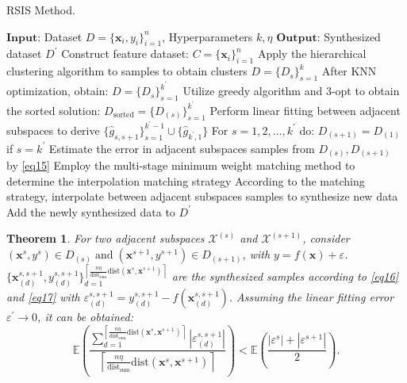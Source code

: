 \documentclass[final,3p,times]{elsarticle}
\newtheorem{theorem}{Theorem}
\begin{document}
\begin{algorithm}[h!]
  \caption{RSIS Method.}\label{alg:alg3}
  \begin{algorithmic}
  \STATE 
  \STATE $\mathbf{Input}$: Dataset $D=\{\boldsymbol{x}_i,y_i \}_{i=1}^n$,
  Hyperparameters $k,\eta$
  \STATE $\mathbf{Output}$: Synthesized dataset $D^\prime$
  \vspace{5pt} %
  \STATE Construct feature dataset: $C=\{\boldsymbol{x}_i\}_{i=1}^n$
  \STATE Apply the hierarchical clustering algorithm to samples to obtain clusters $D=\{D_s\}_{s=1}^{k}$
  \STATE After KNN optimization, obtain: $D=\{D_s\}_{s=1}^{k^\prime}$
  \STATE Utilize greedy algorithm and 3-opt to obtain the sorted solution: $D_{\text{sorted}}=\{D_{(s)}\}_{s=1}^{k^\prime}$
  \STATE Perform linear fitting between adjacent subspaces to derive $\{\hat{g}_{s,s+1}\}_{s=1}^{k^\prime-1}\cup\{\hat{g}_{k^\prime,1}\}$
  \STATE For $s=1,2,\ldots,k^\prime$ do:
  {\color{myred}\STATE \hspace{0.5cm}$D_{(s+1)}=D_{(1)}$ if $s=k^\prime$}
  \STATE \hspace{0.5cm}Estimate the error in adjacent subspaces samples from $D_{(s)},D_{(s+1)}$ by \eqref{eq15}
  \STATE \hspace{0.5cm}Employ the multi-stage minimum weight matching method to determine the interpolation matching strategy
  \STATE \hspace{0.5cm}According to the matching strategy, interpolate between adjacent subspaces samples to synthesize 
new data
  \STATE \hspace{0.5cm}Add the newly synthesized data to $D^\prime$
  \end{algorithmic}
  \label{Alg3}
\end{algorithm}

\begin{theorem}
\label{the4}
For two adjacent subspaces $\mathcal{X}^{(s)}$ and 
$\mathcal{X}^{(s+1)}$, consider $(\boldsymbol{x}^s,{y}^s)\in D_{(s)}
\;\text{and}\; (\boldsymbol{x}^{s+1},{y}^{s+1})\in D_{(s+1)}$, 
with ${y}=f(\boldsymbol{x})+\varepsilon$. $\{\boldsymbol{x}_{(d)}
^{s,s+1},y_{(d)}^{s,s+1} \}_{d=1}^{\left\lceil \frac{n\eta }
{\text{dist}_{\text{sum}}}\text{dist}(\boldsymbol{x}^s,\boldsymbol
{x}^{s+1})\right\rceil}$ are the synthesized samples according to 
\eqref{eq16} and \eqref{eq17} with $\varepsilon^{s,s+1}_{(d)}=
y_{(d)}^{s,s+1}-f(\boldsymbol{x}_{(d)}^{s,s+1})$. Assuming the 
linear fitting error $\varepsilon^\prime\rightarrow0$, it can be 
obtained:
\begin{equation*}
\mathbb{E}(\frac{\textstyle\sum_{d=1}^{{\left\lceil \frac{n\eta }{\text{dist}_{\text{sum}}}\text{dist}(\boldsymbol{x}^s,\boldsymbol{x}^{s+1})\right\rceil}}{|\varepsilon^{s,s+1}_{(d)}|}}{\left\lceil \frac{n\eta }{\text{dist}_{\text{sum}}}\text{dist}(\boldsymbol{x}^s,\boldsymbol{x}^{s+1})\right\rceil})<\mathbb{E}(\frac{|\varepsilon^s|+|\varepsilon^{s+1}|}{2}).
\end{equation*}
\end{theorem}
\end{document}
